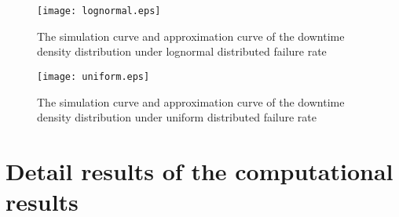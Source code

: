 \documentclass[preprint,12pt]{elsarticle}
\begin{document}
\begin{appendices}
\begin{figure}
\centering
\texttt{[image: lognormal.eps]}
 \caption{The simulation curve and approximation curve of the downtime density distribution under lognormal distributed failure rate}
 \label{fig:lognormal}
\end{figure}


\begin{figure}
\centering
\texttt{[image: uniform.eps]}
 \caption{The simulation curve and approximation curve of the downtime density distribution under uniform distributed failure rate}
  \label{fig:uniform}
\end{figure}


\section{Detail results of the computational results}
\label{appendix:oppdetailresults}
%

\end{appendices}
\end{document}
